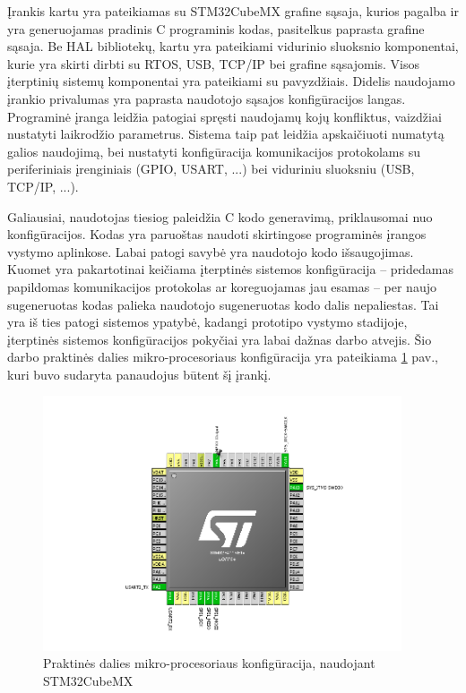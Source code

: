 Įrankis kartu yra pateikiamas su STM32CubeMX grafine sąsaja, kurios pagalba ir yra generuojamas pradinis C programinis kodas, 
pasitelkus paprasta grafine sąsaja.
Be HAL bibliotekų, kartu yra pateikiami vidurinio sluoksnio komponentai, kurie yra skirti dirbti su RTOS, USB, TCP/IP bei grafine sąsajomis.
Visos įterptinių sistemų komponentai yra pateikiami su pavyzdžiais.
Didelis naudojamo įrankio privalumas yra paprasta naudotojo sąsajos konfigūracijos langas.
Programinė įranga leidžia patogiai spręsti naudojamų kojų konfliktus, vaizdžiai nustatyti laikrodžio parametrus.
Sistema taip pat leidžia apskaičiuoti numatytą galios naudojimą, bei nustatyti konfigūracija komunikacijos protokolams su periferiniais įrenginiais (GPIO, USART, ...) bei viduriniu sluoksniu (USB, TCP/IP, ...).

Galiausiai, naudotojas tiesiog paleidžia C kodo generavimą, priklausomai nuo konfigūracijos.
Kodas yra paruoštas naudoti skirtingose programinės įrangos vystymo aplinkose.
Labai patogi savybė yra naudotojo kodo išsaugojimas.
Kuomet yra pakartotinai keičiama įterptinės sistemos konfigūracija -- pridedamas papildomas komunikacijos protokolas ar koreguojamas jau esamas -- per naujo sugeneruotas kodas palieka naudotojo sugeneruotas kodo dalis nepaliestas. 
Tai yra iš ties patogi sistemos ypatybė, kadangi prototipo vystymo stadijoje, įterptinės sistemos konfigūracijos pokyčiai yra labai dažnas darbo atvejis.
Šio darbo praktinės dalies mikro-procesoriaus konfigūracija yra pateikiama \ref{fig:stm32_cube_mx} pav., kuri buvo sudaryta panaudojus būtent šį įrankį.

\begin{figure}[H]
    \centering
    \includegraphics[width=400px]{img/cubemx.png}
    \caption{Praktinės dalies mikro-procesoriaus konfigūracija, naudojant STM32CubeMX \cite{STM3293:online}}
    \label{fig:stm32_cube_mx}
\end{figure}

